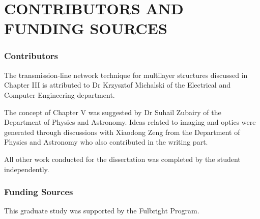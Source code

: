 %
%
%
%


\chapter*{CONTRIBUTORS AND FUNDING SOURCES}


\subsection*{Contributors}

The transmission-line network technique for multilayer structures discussed in Chapter III is attributed to Dr Krzysztof Michalski of the Electrical and Computer Engineering department.

The concept of Chapter V was suggested by Dr Suhail Zubairy of the Department of Physics and Astronomy. Ideas related to imaging and optics were generated through discussions with Xiaodong Zeng from the Department of Physics and Astronomy who also contributed in the writing part.

All other work conducted for the dissertation was completed by the student independently.

\subsection*{Funding Sources}
This graduate study was supported by the Fulbright Program.
\pagebreak{}
